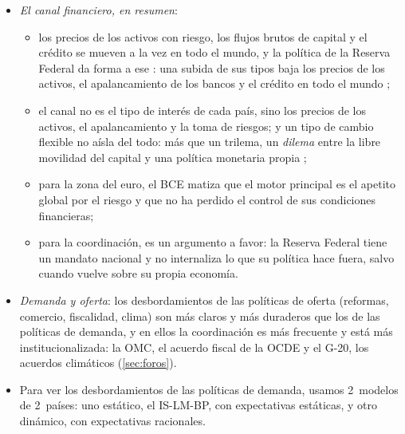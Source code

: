 \documentclass[11pt]{article}
\begin{document}
\begin{itemize}
\begin{itemize}
  \item \emph{la renta}, por la cuenta corriente: parte de lo que gasta un país son importaciones, es decir, exportaciones de sus socios (el );
  \item \emph{el tipo de interés}, por la cuenta financiera: un país grande mueve el tipo de interés mundial y, con él, la inversión de los demás;
  \item \emph{el tipo de cambio}, por las 2~cuentas: la depreciación de uno es la apreciación del otro, que pierde competitividad;
  \item \emph{los precios relativos}: la relación real de intercambio, cuánto consume un país con lo que produce. Solo aparece en los modelos con microfundamentos (\ref{sec:corsetti-pesenti});
  \item \emph{los precios de los activos y el crédito}: el canal financiero, que la crisis de 2008 puso en primer plano.
  \end{itemize}
\item \emph{El canal financiero, en resumen}:
  \begin{itemize}
  \item los precios de los activos con riesgo, los flujos brutos de capital y el crédito se mueven a la vez en todo el mundo, y la política de la Reserva Federal da forma a ese : una subida de sus tipos baja los precios de los activos, el apalancamiento de los bancos y el crédito en todo el mundo\nocite{Rey2013Dilema,MirandaAgrippinoRey2020} ;
  \item el canal no es el tipo de interés de cada país, sino los precios de los activos, el apalancamiento y la toma de riesgos; y un tipo de cambio flexible no aísla del todo: más que un trilema, un \emph{dilema} entre la libre movilidad del capital y una política monetaria propia ;
  \item para la zona del euro, el BCE matiza que el motor principal es el apetito global por el riesgo y que no ha perdido el control de sus condiciones financieras\nocite{HabibVenditti2018};
  \item para la coordinación, es un argumento a favor: la Reserva Federal tiene un mandato nacional y no internaliza lo que su política hace fuera, salvo cuando vuelve sobre su propia economía.
  \end{itemize}
\item \emph{Demanda y oferta}: los desbordamientos de las políticas de oferta (reformas, comercio, fiscalidad, clima) son más claros y más duraderos que los de las políticas de demanda, y en ellos la coordinación es más frecuente y está más institucionalizada: la OMC, el acuerdo fiscal de la OCDE y el G-20, los acuerdos climáticos (\ref{sec:foros}).
\item Para ver los desbordamientos de las políticas de demanda, usamos 2~modelos de 2~países: uno estático, el IS-LM-BP, con expectativas estáticas, y otro dinámico, con expectativas racionales.
\end{itemize}
\end{document}
